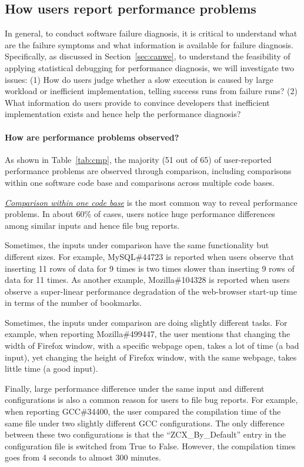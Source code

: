 \subsection{How users report performance problems}
In general, to conduct software failure diagnosis, it is critical to understand 
what are the failure symptoms and what information is available for failure
diagnosis. 
Specifically, as discussed in Section~\ref{sec:canwe}, to understand the
feasibility of applying statistical debugging for performance diagnosis, we
will investigate two issues: (1)
How do users judge whether a slow execution is caused by large workload or
inefficient implementation, telling success runs from failure
runs?
(2)
What information do users provide to convince developers that inefficient
implementation exists and hence help the performance diagnosis?

\paragraph{How are performance problems observed?}

As shown in Table~\ref{tab:cmp}, the majority (51 out of 65) of user-reported 
performance problems are observed through comparison, including
comparisons within one software code base and comparisons across multiple code bases.

\underline{\it Comparison within one code base} 
is the most common way to reveal performance problems.  
In about 60\% of cases, 
users notice huge performance differences among
similar inputs and hence file bug reports.

Sometimes, the inputs under comparison have the same functionality but different
sizes. For example, MySQL\#44723 is reported when users observe that inserting
11 rows of data for 9 times is two times slower than inserting 9 rows of data
for 11 times. As another example, Mozilla\#104328 is reported when users observe
a super-linear performance degradation of the web-browser start-up time in terms
of the number of bookmarks.

Sometimes, the inputs under comparison are doing slightly different tasks.
For example, when reporting Mozilla\#499447, the user mentions that changing the width
of Firefox window, with a specific webpage open, takes a lot of time (a bad input), yet
changing the height of Firefox window, with the same webpage,
takes little time (a good 
input).

Finally, large performance difference under the same input and different
configurations is also a common reason for users to file bug reports.
For example, when reporting GCC\#34400, the user compared the compilation time
of the same file under two slightly different GCC configurations.
The only difference between these two configurations is that the ``ZCX\_By\_Default''
entry in the configuration file is switched from True to False. 
However, the compilation times goes from 4 seconds to almost 300 minutes.

